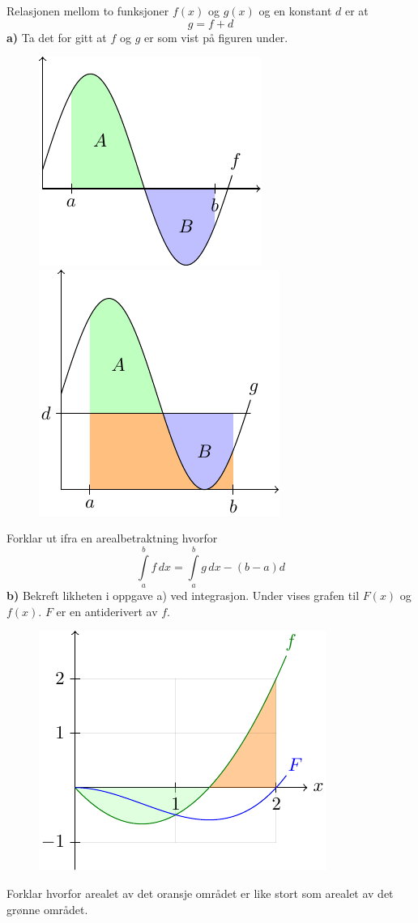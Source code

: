 \nes
{}
Relasjonen mellom to funksjoner $ f(x) $ og $ g(x) $ og en konstant $ d $ er at
\[ g=f+d \]
\textbf{a)} Ta det for gitt at $ f $ og $ g $ er som vist på figuren under.
\begin{figure}
\centering
\includegraphics[scale=0.9]{../fig/int6a}\quad
\includegraphics[scale=0.9]{../fig/int6b}
\end{figure}
Forklar ut ifra en arealbetraktning hvorfor\[ \int\limits_a^b f \,dx=\int\limits_a^b g\,dx -(b-a)d  \]
\textbf{b)} Bekreft likheten i oppgave a) ved integrasjon.
\newpage
{}
Under vises grafen til $ F(x) $ og $ f(x) $. $ F $ er en antiderivert av $ f $.
\begin{figure}
	\centering
	\includegraphics[scale=0.9]{../fig/faropg}\\
	\raggedright
\end{figure}
Forklar hvorfor arealet av det oransje området er like stort som arealet av det grønne området.

